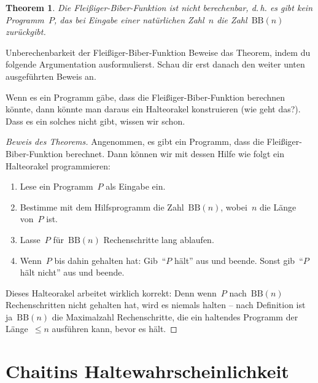 \documentclass[twoside]{../zirkelblatt1415}
\theoremstyle{definition}
\theoremstyle{plain}
\newtheorem{thm}[defn]{Theorem}
\theoremstyle{remark}
\newenvironment{listing}{
  \renewcommand*\theenumi{\arabic{enumi}}
  \renewcommand{\labelenumi}{\theenumi.}
  \begin{enumerate}\itemsep0em}{\end{enumerate}}
\newcommand{\BB}{\mathrm{BB}}
\begin{document}
\begin{thm}Die Fleißiger-Biber-Funktion ist nicht berechenbar, d.\,h. es gibt
kein Programm~$P$, das bei Eingabe einer natürlichen Zahl~$n$ die Zahl~$\BB(n)$
zurückgibt.\end{thm}

\begin{aufgabeShaded}{Unberechenbarkeit der Fleißiger-Biber-Funktion}
\label{aufg:bb}
Beweise das Theorem, indem du folgende Argumentation ausformulierst. Schau dir
erst danach den weiter unten ausgeführten Beweis an.

Wenn es ein Programm gäbe, dass die Fleißiger-Biber-Funktion
berechnen könnte, dann könnte man daraus ein Halteorakel konstruieren (wie geht
das?). Dass es ein solches nicht gibt, wissen wir schon.
\end{aufgabeShaded}

\begin{proof}[Beweis des Theorems]
Angenommen, es gibt ein Programm, dass die Fleißiger-Biber-Funktion
berechnet. Dann können wir mit dessen Hilfe wie folgt ein Halteorakel programmieren:
\begin{listing}
\item Lese ein Programm~$P$ als Eingabe ein.
\item Bestimme mit dem Hilfsprogramm die Zahl~$\BB(n)$, wobei~$n$ die Länge
von~$P$ ist.
\item Lasse~$P$ für~$\BB(n)$ Rechenschritte lang ablaufen.
\item Wenn~$P$ bis dahin gehalten hat: Gib~"`$P$ hält"' aus und beende.
Sonst gib~"`$P$ hält nicht"' aus und beende.
\end{listing}
Dieses Halteorakel arbeitet wirklich korrekt: Denn wenn~$P$ nach~$\BB(n)$
Rechenschritten nicht gehalten hat, wird es niemals halten -- nach Definition
ist ja~$\BB(n)$ die Maximalzahl Rechenschritte, die ein haltendes Programm der
Länge~$\leq n$ ausführen kann, bevor es hält.
\end{proof}


\section{Chaitins Haltewahrscheinlichkeit}
\end{document}
